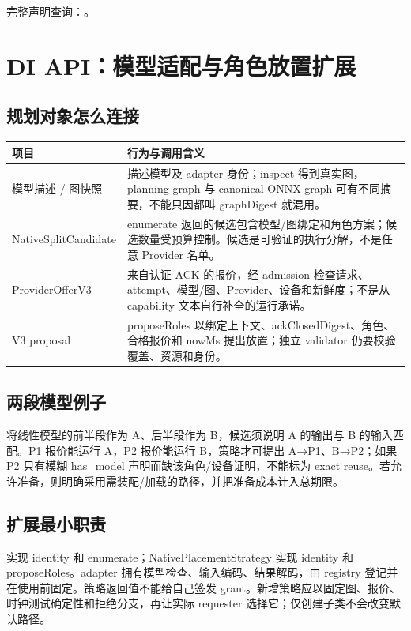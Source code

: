 完整声明查询：。

\section{DI API：模型适配与角色放置扩展}

\subsection{规划对象怎么连接}

\begin{longtable}{@{}p{43mm}p{119mm}@{}}
\toprule
项目 & 行为与调用含义 \\
\midrule\endhead
模型描述 / 图快照 & 描述模型及 adapter 身份；inspect 得到真实图，planning graph 与 canonical ONNX graph 可有不同摘要，不能只因都叫 graphDigest 就混用。 \\
NativeSplitCandidate & enumerate 返回的候选包含模型/图绑定和角色方案；候选数量受预算控制。候选是可验证的执行分解，不是任意 Provider 名单。 \\
ProviderOfferV3 & 来自认证 ACK 的报价，经 admission 检查请求、attempt、模型/图、Provider、设备和新鲜度；不是从 capability 文本自行补全的运行承诺。 \\
V3 proposal & proposeRoles 以绑定上下文、ackClosedDigest、角色、合格报价和 nowMs 提出放置；独立 validator 仍要校验覆盖、资源和身份。 \\
\bottomrule
\end{longtable}

\subsection{两段模型例子}
将线性模型的前半段作为 A、后半段作为 B，候选须说明 A 的输出与 B 的输入匹配。P1 报价能运行 A，P2 报价能运行 B，策略才可提出 A→P1、B→P2；如果 P2 只有模糊 has\_model 声明而缺该角色/设备证明，不能标为 exact reuse。若允许准备，则明确采用需装配/加载的路径，并把准备成本计入总期限。

\subsection{扩展最小职责}
 实现 identity 和 enumerate；NativePlacementStrategy 实现 identity 和 proposeRoles。adapter 拥有模型检查、输入编码、结果解码，由 registry 登记并在使用前固定。策略返回值不能给自己签发 grant。新增策略应以固定图、报价、时钟测试确定性和拒绝分支，再让实际 requester 选择它；仅创建子类不会改变默认路径。

